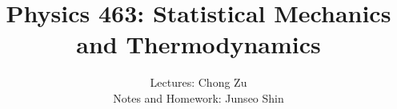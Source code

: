 \documentclass{article}
\author{Lectures: Chong Zu \\ Notes and Homework: Junseo Shin}
\date{}
\title{Physics 463: Statistical Mechanics and Thermodynamics}
\begin{document}
\maketitle
\tableofcontents
\pagebreak



\newpage


\newpage


\newpage

\end{document}
